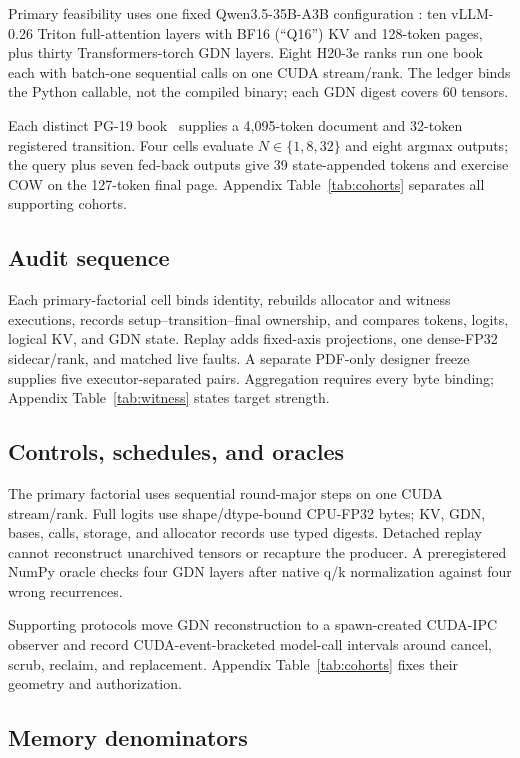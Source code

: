 \documentclass{article}
\begin{document}
Primary feasibility uses one fixed Qwen3.5-35B-A3B configuration
\citep{qwen2026qwen35,qwen2026qwen35modelcard}: ten vLLM-0.26 Triton
full-attention layers with BF16 (``Q16'') KV and 128-token pages, plus thirty
Transformers-torch GDN layers.  Eight H20-3e ranks run one book each with
batch-one sequential calls on one CUDA stream/rank.  The ledger binds the
Python callable, not the compiled binary; each GDN digest covers 60 tensors.

Each distinct PG-19 book~\citep{rae2020compressive} supplies a 4,095-token
document and 32-token registered transition.  Four cells evaluate
$N\in\{1,8,32\}$ and eight argmax outputs; the query plus seven fed-back outputs
give 39 state-appended tokens and exercise COW on the 127-token final page.
Appendix Table~\ref{tab:cohorts} separates all supporting cohorts.

\subsection{Audit sequence}

Each primary-factorial cell binds identity, rebuilds allocator and witness executions,
records setup--transition--final ownership, and compares tokens, logits,
logical KV, and GDN state.  Replay adds fixed-axis projections, one dense-FP32
sidecar/rank, and matched live faults.  A separate PDF-only designer freeze
supplies five executor-separated pairs.  Aggregation requires every byte binding; Appendix
Table~\ref{tab:witness} states target strength.

\subsection{Controls, schedules, and oracles}

The primary factorial uses sequential round-major steps on one CUDA stream/rank.  Full logits use
shape/dtype-bound CPU-FP32 bytes; KV, GDN, bases, calls, storage, and allocator
records use typed digests.  Detached replay cannot reconstruct unarchived
tensors or recapture the producer.  A preregistered NumPy oracle checks four
GDN layers after native q/k normalization against four wrong recurrences.

Supporting protocols move GDN reconstruction to a spawn-created CUDA-IPC
observer and record CUDA-event-bracketed model-call intervals around cancel,
scrub, reclaim, and replacement.  Appendix Table~\ref{tab:cohorts} fixes their
geometry and authorization.

\subsection{Memory denominators}
\label{sec:denominators}
\end{document}
